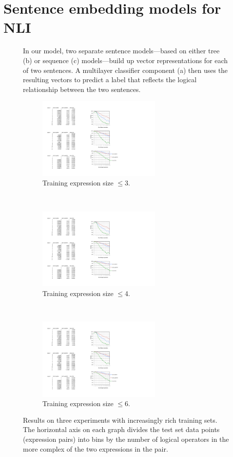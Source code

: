 \section{Sentence embedding models for NLI} \label{methods}

\begin{figure}[t!]
  \centering
  
  \caption{In our model, two separate sentence models---based on either tree (b) or sequence (c) models---build up vector representations for each of two sentences. A multilayer classifier component (a) then uses the resulting vectors to predict a label that reflects the logical relationship between the two sentences.} 
  \label{sample-figure}
\end{figure}

\begin{figure}[t]
  \centering
\begin{subfigure}[t]{0.29\textwidth}
  \includegraphics[height=1.6in]{fig3.pdf}
  \caption{Training expression size $\le$3.}
  \end{subfigure}~~
\begin{subfigure}[t]{0.29\textwidth}
    \includegraphics[height=1.6in]{fig4.pdf}
  \caption{Training expression size $\le$4.}
  \end{subfigure}~~
\begin{subfigure}[t]{0.4\textwidth}
      \includegraphics[height=1.6in]{fig6.pdf}
  \caption{Training expression size $\le$6.}
\end{subfigure}
  \caption{Results on three experiments with increasingly rich training sets. The horizontal axis on each graph divides the test set data points (expression pairs) into bins by the number of logical operators in the more complex of the two expressions in the pair.}
  \label{prop-results} 
\end{figure}


